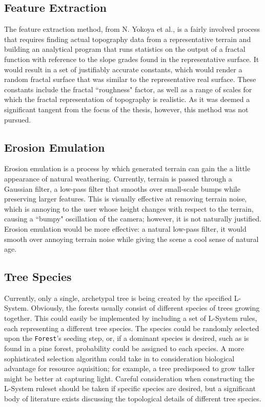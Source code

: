 \documentclass{article}
\newcommand{\tab}{\hspace*{2em}}
\begin{document}
        \subsection{Feature Extraction}
    \tab The feature extraction method, from N. Yokoya et al.\cite{yokoya89}, is a fairly involved
process that requires finding actual topography data from a representative terrain and building an
analytical program that runs statistics on the output of a fractal function with reference to the
slope grades found in the representative surface. It would result in a set of justifiably accurate
constants, which would render a random fractal surface that was similar to the representative real
surface. These constants include the fractal ``roughness" factor, as well as a range of scales for
which the fractal representation of topography is realistic. As it was deemed a significant tangent
from the focus of the thesis, however, this method was not pursued.

        \subsection{Erosion Emulation}
    \tab Erosion emulation\cite{mustgrave89} is a process by which generated terrain can gain the a little
appearance of natural weathering. Currently, terrain is passed through a Gaussian filter, a
low-pass filter that smooths over small-scale bumps while preserving larger features. This is
visually effective at removing terrain noise, which is annoying to the user whose height changes
with respect to the terrain, causing a ``bumpy" oscillation of the camera; however, it is not
naturally justified. Erosion emulation would be more effective: a natural low-pass filter, it would
smooth over annoying terrain noise while giving the scene a cool sense of natural age.

        \subsection{Tree Species}
    \tab Currently, only a single, archetypal tree is being created by the specified L-System.
Obviously, the forests usually consist of different species of trees growing together. This could
easily be implemented by including a set of L-System rules, each representing a different tree
species. The species could be randomly selected upon the \verb|Forest|'s seeding step, or, if a
dominant species is desired, such as is found in a pine forest, probability could be assigned to
each species. A more sophisticated selection algorithm could take in to consideration biological
advantage for resource aquisition; for example, a tree predisposed to grow taller might be better
at capturing light. Careful consideration when constructing the L-System ruleset should be taken if
specific species are desired, but a significant body of literature exists discussing the
topological details of different tree species.
\end{document}
